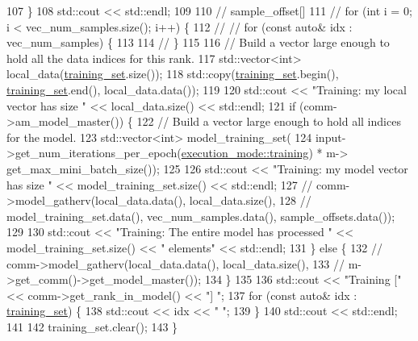 \begin{DoxyCode}
107   \}
108   std::cout << std::endl;
109 
110   \textcolor{comment}{// sample\_offset[]}
111   \textcolor{comment}{// for (int i = 0; i < vec\_num\_samples.size(); i++) \{}
112   \textcolor{comment}{//   //  for (const auto& idx : vec\_num\_samples) \{}
113 
114   \textcolor{comment}{// \}}
115 
116   \textcolor{comment}{// Build a vector large enough to hold all the data indices for this rank.}
117   std::vector<int> local\_data(\hyperlink{classlbann_1_1lbann__callback__check__dataset_a22d16efa2ec47759766f2f7478b11059}{training\_set}.size());
118   std::copy(\hyperlink{classlbann_1_1lbann__callback__check__dataset_a22d16efa2ec47759766f2f7478b11059}{training\_set}.begin(), \hyperlink{classlbann_1_1lbann__callback__check__dataset_a22d16efa2ec47759766f2f7478b11059}{training\_set}.end(), local\_data.data());
119 
120   std::cout << \textcolor{stringliteral}{"Training: my local vector has size "} << local\_data.size() << std::endl;
121   \textcolor{keywordflow}{if} (comm->am\_model\_master()) \{
122     \textcolor{comment}{// Build a vector large enough to hold all indices for the model.}
123     std::vector<int> model\_training\_set(
124       input->get\_num\_iterations\_per\_epoch(\hyperlink{base_8hpp_a2781a159088df64ed7d47cc91c4dc0a8ac185ddac8b5a8f5aa23c5b80bc12d214}{execution\_mode::training}) * m->
      get\_max\_mini\_batch\_size());
125 
126     std::cout << \textcolor{stringliteral}{"Training: my model vector has size "} << model\_training\_set.size() << std::endl;
127     \textcolor{comment}{// comm->model\_gatherv(local\_data.data(), local\_data.size(),}
128     \textcolor{comment}{//                     model\_training\_set.data(), vec\_num\_samples.data(), sample\_offsets.data());}
129 
130     std::cout << \textcolor{stringliteral}{"Training: The entire model has processed "} << model\_training\_set.size() << \textcolor{stringliteral}{" elements"} <<
       std::endl;
131   \} \textcolor{keywordflow}{else} \{
132     \textcolor{comment}{// comm->model\_gatherv(local\_data.data(), local\_data.size(),}
133     \textcolor{comment}{//                     m->get\_comm()->get\_model\_master());}
134   \}
135 
136   std::cout << \textcolor{stringliteral}{"Training ["} << comm->get\_rank\_in\_model() << \textcolor{stringliteral}{"] "};
137   \textcolor{keywordflow}{for} (\textcolor{keyword}{const} \textcolor{keyword}{auto}& idx : \hyperlink{classlbann_1_1lbann__callback__check__dataset_a22d16efa2ec47759766f2f7478b11059}{training\_set}) \{
138     std::cout << idx << \textcolor{stringliteral}{" "};
139   \}
140   std::cout << std::endl;
141 
142   training\_set.clear();
143 \}
\end{DoxyCode}
